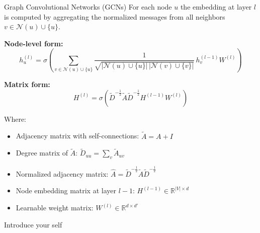 \documentclass[aspectratio=169]{beamer}
\renewcommand{\alert}[1]{\textbf{\color{swufe}#1}}
\begin{document}
        \begin{frame}{Graph Convolutional Networks (GCNs)}
            For each node $u$ the embedding at layer $l$ is computed by aggregating the normalized messages from all neighbors $v \in \mathcal{N}(u) \cup \{u\}$. %

            \alert{Node-level form:}
            \begin{equation}
                h_u^{(l)} = \sigma\left(\sum_{v \in \mathcal{N}(u) \cup \{u\}} \frac{1}{\sqrt{|\mathcal{N}(u) \cup \{u\}| \, |\mathcal{N}(v) \cup \{v\}|}}\, h_v^{(l-1)} W^{(l)}\right)
            \end{equation}

            \alert{Matrix form:}
            \begin{equation}
                H^{(l)} = \sigma\left(\tilde{D}^{-\frac{1}{2}}\tilde{A}\tilde{D}^{-\frac{1}{2}}H^{(l-1)} W^{(l)}\right)
            \end{equation}

            Where:
            \begin{itemize}
                \item Adjacency matrix with self-connections: $\tilde{A} = A + I$
                \item Degree matrix of $\tilde{A}$: $\tilde{D}_{uu} = \sum_v \tilde{A}_{uv}$
                \item Normalized adjacency matrix: $\hat{A} = \tilde{D}^{-\frac{1}{2}}\tilde{A}\tilde{D}^{-\frac{1}{2}}$
                \item Node embedding matrix at layer $l-1$: $H^{(l-1)} \in \mathbb{R}^{|V| \times d}$
                \item Learnable weight matrix: $W^{(l)} \in \mathbb{R}^{d \times d'}$
            \end{itemize}

            \begin{note}
                {Introduce your self}
            \end{note}
        \end{frame}
\end{document}
